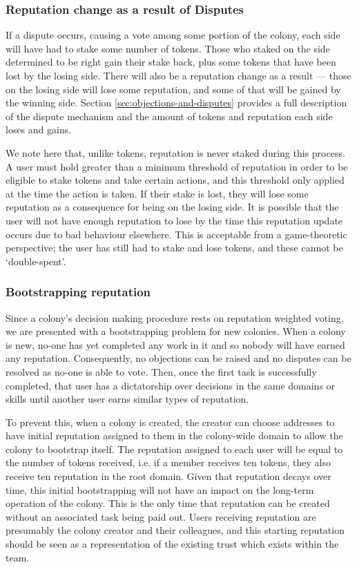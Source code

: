 \subsubsection{Reputation change as a result of Disputes}\label{sec:earning-rep-in-disputes}
If a dispute occurs, causing a vote among some portion of the colony, each side will have had to stake some number of tokens. Those who staked on the side determined to be right gain their stake back, plus some tokens that have been lost by the losing side. There will also be a reputation change as a result --- those on the losing side will lose some reputation, and some of that will be gained by the winning side. Section \ref{sec:objections-and-disputes} provides a full description of the dispute mechanism and the amount of tokens and reputation each side loses and gains.

We note here that, unlike tokens, reputation is never staked during this process. A user must hold greater than a minimum threshold of reputation in order to be eligible to stake tokens and take certain actions, and this threshold only applied at the time the action is taken. If their stake is lost, they will lose some reputation as a consequence for being on the losing side. It is possible that the user will not have enough reputation to lose by the time this reputation update occurs due to bad behaviour elsewhere. This is acceptable from a game-theoretic perspective; the user has still had to stake and lose tokens, and these cannot be `double-spent'.

\subsubsection{Bootstrapping reputation}\label{sec:bootstrapping-rep}
Since a colony's decision making procedure rests on reputation weighted voting, we are presented with a bootstrapping problem for new colonies. When a colony is new, no-one has yet completed any work in it and so nobody will have earned any reputation. Consequently, no objections can be raised and no disputes can be resolved as no-one is able to vote. Then, once the first task is successfully completed, that user has a dictatorship over decisions in the same domains or skills until another user earns similar types of reputation.

To prevent this, when a colony is created, the creator can choose addresses to have initial reputation assigned to them in the colony-wide domain to allow the colony to bootstrap itself. The reputation assigned to each user will be equal to the number of tokens received, i.e. if a member receives ten tokens, they also receive ten reputation in the root domain. Given that reputation decays over time, this initial bootstrapping will not have an impact on the long-term operation of the colony. This is the only time that reputation can be created without an associated task being paid out. Users receiving reputation are presumably the colony creator and their colleagues, and this starting reputation should be seen as a representation of the existing trust which exists within the team.

